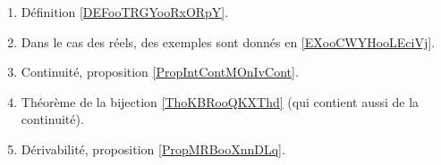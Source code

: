 
\begin{enumerate}
    \item
        Définition \ref{DEFooTRGYooRxORpY}.
    \item
        Dans le cas des réels, des exemples sont donnés en \ref{EXooCWYHooLEciVj}.
    \item
        Continuité, proposition \ref{PropIntContMOnIvCont}.
    \item
        Théorème de la bijection \ref{ThoKBRooQKXThd} (qui contient aussi de la continuité).
    \item
        Dérivabilité, proposition \ref{PropMRBooXnnDLq}.
\end{enumerate}

